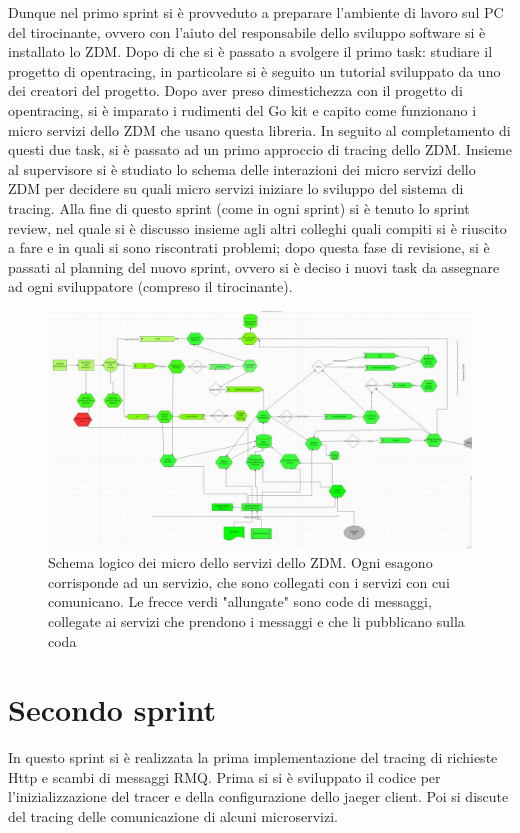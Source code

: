 \documentclass[a4paper,12pt,titlepage,italian,openany]{report}
\begin{document}
Dunque nel primo sprint si è provveduto a preparare l'ambiente di lavoro sul PC del tirocinante, ovvero con l'aiuto del responsabile dello sviluppo software si è installato lo ZDM\cite{zdm:1}. Dopo di che si è passato a svolgere il primo task: studiare il progetto di opentracing, in particolare
si è seguito un tutorial sviluppato da uno dei creatori del progetto. Dopo aver preso dimestichezza con il progetto di opentracing, si è imparato i rudimenti del Go kit e capito come funzionano i micro servizi dello ZDM che usano questa libreria.
In seguito al completamento di questi due task, si è passato ad un primo approccio di tracing dello ZDM.
Insieme al supervisore si è studiato lo schema delle interazioni dei micro servizi dello ZDM\cite{zdm:1} per decidere su quali micro servizi iniziare lo sviluppo del sistema di tracing.
Alla fine di questo sprint (come in ogni sprint) si è tenuto lo sprint review, nel quale si è discusso insieme agli altri colleghi quali compiti si è  riuscito a fare e in quali si sono riscontrati problemi; dopo questa fase di revisione, si è passati al planning del nuovo sprint, ovvero si è deciso i nuovi task da assegnare ad ogni sviluppatore (compreso il tirocinante).
\begin{figure}[H]
    \includegraphics[scale=0.4]{41.jpg}
    \centering
    \caption{Schema logico dei micro dello servizi dello ZDM\cite{zdm:1}. Ogni esagono corrisponde ad un servizio, che sono collegati con i servizi con cui comunicano. Le frecce verdi "allungate" sono code di messaggi, collegate ai servizi che prendono i messaggi e che li pubblicano sulla coda }
\end{figure}  

\newpage
\section{Secondo sprint}
In questo sprint si è realizzata la prima implementazione del tracing di richieste Http e scambi di messaggi RMQ. Prima si 
si è sviluppato il codice per l'inizializzazione del tracer e della configurazione dello jaeger client. Poi si discute del tracing delle comunicazione di alcuni microservizi.
\end{document}
